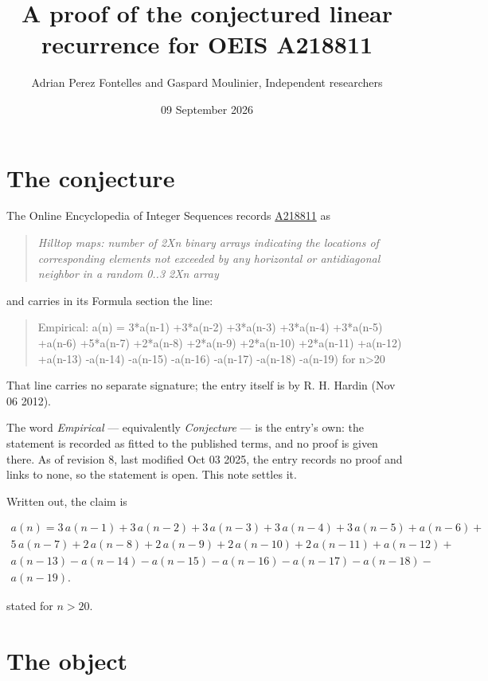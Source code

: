 \documentclass[11pt]{article}
\title{A proof of the conjectured linear recurrence for OEIS A218811}
\author{Adrian Perez Fontelles and Gaspard Moulinier, Independent researchers}
\date{09 September 2026}
\theoremstyle{definition}
\begin{document}
\maketitle
\section{The conjecture}

The Online Encyclopedia of Integer Sequences records \href{https://oeis.org/A218811}{A218811} as

\begin{quote}\itshape Hilltop maps: number of 2Xn binary arrays indicating the locations of corresponding elements not exceeded by any horizontal or antidiagonal neighbor in a random 0..3 2Xn array\end{quote}

and carries in its Formula section the line:

\begin{quote}\ttfamily Empirical: a(n) = 3*a(n-1) +3*a(n-2) +3*a(n-3) +3*a(n-4) +3*a(n-5) +a(n-6) +5*a(n-7) +2*a(n-8) +2*a(n-9) +2*a(n-10) +2*a(n-11) +a(n-12) +a(n-13) -a(n-14) -a(n-15) -a(n-16) -a(n-17) -a(n-18) -a(n-19) for n>20\end{quote}

That line carries no separate signature; the entry itself is by R. H. Hardin (Nov 06 2012).

The word {\itshape Empirical} --- equivalently {\itshape Conjecture} --- is the entry's own: the statement is recorded as fitted to the published terms, and no proof is given there. As of revision 8, last modified Oct 03 2025, the entry records no proof and links to none, so the statement is open. This note settles it.

Written out, the claim is

\begin{multline*} a(n) = 3\,a(n-1) + 3\,a(n-2) + 3\,a(n-3) + 3\,a(n-4) + 3\,a(n-5) + a(n-6) + \\ 5\,a(n-7) + 2\,a(n-8) + 2\,a(n-9) + 2\,a(n-10) + 2\,a(n-11) + a(n-12) + \\ a(n-13) - a(n-14) - a(n-15) - a(n-16) - a(n-17) - a(n-18) - \\ a(n-19). \end{multline*}

stated for $n > 20$.

\section{The object}
\end{document}
